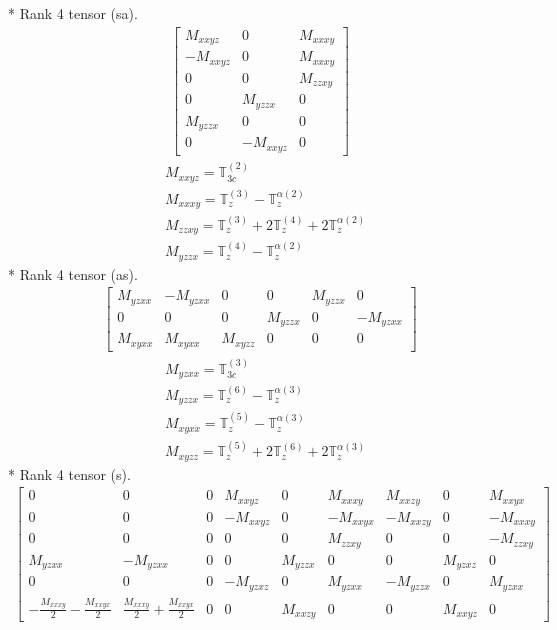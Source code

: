 \documentclass[fleqn,8pt,landscape]{jsarticle}
\begin{document}
* Rank 4 tensor (sa).
\begin{align*}
\begin{bmatrix} M_{xxyz} & 0 & M_{xxxy} \\ - M_{xxyz} & 0 & M_{xxxy} \\ 0 & 0 & M_{zzxy} \\ 0 & M_{yzzx} & 0 \\ M_{yzzx} & 0 & 0 \\ 0 & - M_{xxyz} & 0 \end{bmatrix}
\end{align*}
\begin{align*}
& M_{xxyz} = \mathbb{T}_{3c}^{(2)} \\
& M_{xxxy} = \mathbb{T}_{z}^{(3)} - \mathbb{T}_{z}^{\alpha(2)} \\
& M_{zzxy} = \mathbb{T}_{z}^{(3)} + 2 \mathbb{T}_{z}^{(4)} + 2 \mathbb{T}_{z}^{\alpha(2)} \\
& M_{yzzx} = \mathbb{T}_{z}^{(4)} - \mathbb{T}_{z}^{\alpha(2)}
\end{align*}
* Rank 4 tensor (as).
\begin{align*}
\begin{bmatrix} M_{yzxx} & - M_{yzxx} & 0 & 0 & M_{yzzx} & 0 \\ 0 & 0 & 0 & M_{yzzx} & 0 & - M_{yzxx} \\ M_{xyxx} & M_{xyxx} & M_{xyzz} & 0 & 0 & 0 \end{bmatrix}
\end{align*}
\begin{align*}
& M_{yzxx} = \mathbb{T}_{3c}^{(3)} \\
& M_{yzzx} = \mathbb{T}_{z}^{(6)} - \mathbb{T}_{z}^{\alpha(3)} \\
& M_{xyxx} = \mathbb{T}_{z}^{(5)} - \mathbb{T}_{z}^{\alpha(3)} \\
& M_{xyzz} = \mathbb{T}_{z}^{(5)} + 2 \mathbb{T}_{z}^{(6)} + 2 \mathbb{T}_{z}^{\alpha(3)}
\end{align*}
* Rank 4 tensor (s).
\begin{align*}
\begin{bmatrix} 0 & 0 & 0 & M_{xxyz} & 0 & M_{xxxy} & M_{xxzy} & 0 & M_{xxyx} \\ 0 & 0 & 0 & - M_{xxyz} & 0 & - M_{xxyx} & - M_{xxzy} & 0 & - M_{xxxy} \\ 0 & 0 & 0 & 0 & 0 & M_{zzxy} & 0 & 0 & - M_{zzxy} \\ M_{yzxx} & - M_{yzxx} & 0 & 0 & M_{yzzx} & 0 & 0 & M_{yzxz} & 0 \\ 0 & 0 & 0 & - M_{yzxz} & 0 & M_{yzxx} & - M_{yzzx} & 0 & M_{yzxx} \\ - \frac{M_{xxxy}}{2} - \frac{M_{xxyx}}{2} & \frac{M_{xxxy}}{2} + \frac{M_{xxyx}}{2} & 0 & 0 & M_{xxzy} & 0 & 0 & M_{xxyz} & 0 \end{bmatrix}
\end{align*}
\end{document}
